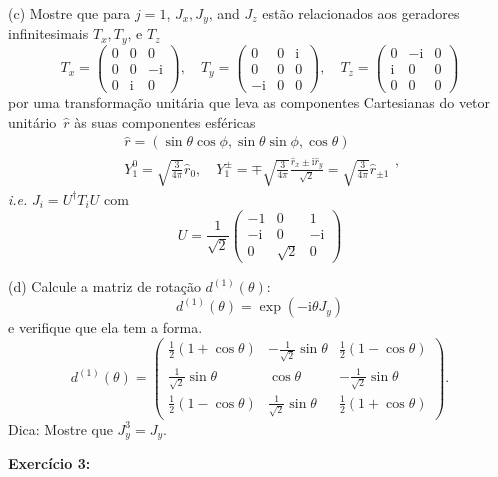 \documentclass[12pt]{article}
\begin{document}
(c) Mostre que para $j=1$, $J_{x}, J_{y}$, and $J_{z}$ estão relacionados aos geradores infinitesimais $T_{x}, T_{y}$, e $T_{z}$ 
\[
T_{x}=\left(\begin{array}{ccc}0 & 0 & 0 \\ 0 & 0 & -\mathrm{i} \\ 0 & \mathrm{i} & 0\end{array}\right), \quad 
T_{y}=\left(\begin{array}{ccc}0 & 0 & \mathrm{i} \\ 0 & 0 & 0 \\ -\mathrm{i} & 0 & 0\end{array}\right), \quad 
T_{z}=\left(\begin{array}{ccc}0 & -\mathrm{i} & 0 \\ \mathrm{i} & 0 & 0 \\ 0 & 0 & 0\end{array}\right)
\]
por uma transformação unitária que leva as componentes Cartesianas do vetor unitário $\hat{r}$ às suas componentes esféricas
\[
\begin{array}{c}
\hat{r}=(\sin \theta \cos \phi, \sin \theta \sin \phi, \cos \theta) \\ 
Y_{1}^{0}=\sqrt{\frac{3}{4 \pi}} \hat{r}_{0}, \quad Y_{1}^{\pm}=\mp \sqrt{\frac{3}{4 \pi}} \frac{\hat{r}_{x} \pm \mathrm{i} \hat{r}_{y}}{\sqrt{2}}=\sqrt{\frac{3}{4 \pi}} \hat{r}_{\pm 1}
\end{array},
\]
\textit{i.e.} $J_{i}=U^{\dagger} T_{i} U$ com
\[
U=\frac{1}{\sqrt{2}}\left(\begin{array}{ccc}-1 & 0 & 1 \\ -\mathrm{i} & 0 & -\mathrm{i} \\ 0 & \sqrt{2} & 0\end{array}\right)
\]

(d) Calcule a matriz de rotação $d^{(1)}(\theta)$:
\[
d^{(1)}(\theta)=\exp \left(-\mathrm{i} \theta J_{y}\right)
\]
e verifique que ela tem a forma.
\[
d^{(1)}(\theta)=\left(\begin{array}{ccc}\frac{1}{2}(1+\cos \theta) & -\frac{1}{\sqrt{2}} \sin \theta & \frac{1}{2}(1-\cos \theta) \\ \frac{1}{\sqrt{2}} \sin \theta & \cos \theta & -\frac{1}{\sqrt{2}} \sin \theta \\ \frac{1}{2}(1-\cos \theta) & \frac{1}{\sqrt{2}} \sin \theta & \frac{1}{2}(1+\cos \theta)\end{array}\right).
\]
Dica: Mostre que $J_{y}^{3}=J_{y}$.


\textbf{Exercício 3:}
\end{document}
